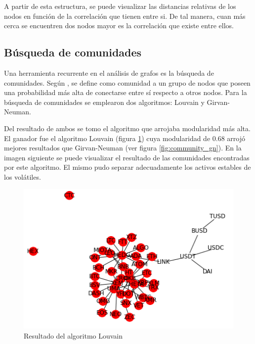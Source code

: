 \documentclass[runningheads,a4paper,10pt]{etc/llncs}
\begin{document}
A partir de esta estructura, se puede visualizar las distancias relativas de los nodos en función de la correlación que tienen entre si. De tal manera, cuan más cerca se encuentren dos nodos mayor es la correlación que existe entre ellos. 

\subsection{Búsqueda de comunidades}

Una herramienta recurrente en el análisis de grafos es la búsqueda de comunidades. Según \cite{networkscience}, se define como comunidad a un grupo de nodos que poseen una probabilidad más alta de conectarse entre sí respecto a otros nodos. Para la búsqueda de comunidades se emplearon dos algoritmos: Louvain y Girvan-Neuman. 

Del resultado de ambos se tomo el algoritmo que arrojaba modularidad más alta. El ganador fue el algoritmo Louvain (figura \ref{fig:community_louvain}) cuya modularidad de 0.68 arrojó mejores resultados que Girvan-Neuman (ver figura \ref{fig:community_gn}). En la imagen siguiente se puede visualizar el resultado de las comunidades encontradas por este algoritmo. El mismo pudo separar adecuadamente los activos estables de los volátiles.


\begin{figure}[htp]
    \centering
    \includegraphics[scale=1]{images/community_louvain.png}
    \caption{Resultado del algoritmo Louvain}
    \label{fig:community_louvain}
\end{figure}
\end{document}

